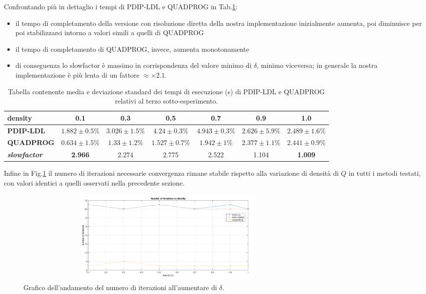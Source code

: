  Confrontando più in dettaglio i tempi di PDIP-LDL e QUADPROG in Tab.\ref{tab:ldlqp3}:
 \begin{itemize}
     \item il tempo di completamento della versione con risoluzione diretta della nostra implementazione inizialmente aumenta, poi diminuisce per poi stabilizzarsi intorno a valori simili a quelli di QUADPROG
     \item il tempo di completamento di QUADPROG, invece, aumenta monotonamente
     \item di conseguenza lo slowfactor è massimo in corrispondenza del valore minimo di $\delta$, minimo viceversa; in generale la nostra implementazione è più lenta di un fattore $\approx \times2.1$.
 \end{itemize}
\begin{table}[!h]
\centering
\begin{tabular}{l|c|c|c|c|c|c}
\textbf{density}                     & \textbf{0.1} & \textbf{0.3} & \textbf{0.5} & \textbf{0.7} & \textbf{0.9} & \textbf{1.0} \\ \hline
\textbf{PDIP-LDL}                    & $1.882 \pm 0.5\%$       & $3.026 \pm 1.5\%$       & $4.24  \pm 0.3\%$       & $4.943 \pm 0.3\%$       & $2.626 \pm 5.9\%$       & $2.489  \pm 1.6\%$       \\
\textbf{QUADPROG}                    & $0.634  \pm 1.5\%$      & $1.33  \pm 1.2\%$       & $1.527 \pm 0.7\%$       & $1.942 \pm 1\%$       & $2.377 \pm 1.1\%$       & $2.441 \pm 0.9\%$       \\
\textbf{\textit{slowfactor}} & \textbf{2.966}       & 2.274       & 2.775       & 2.522       & 1.104       & \textbf{1.009}
\end{tabular}
\caption{Tabella contenente media e deviazione standard dei tempi di esecuzione (s) di PDIP-LDL e QUADPROG relativi al terzo sotto-esperimento. \label{tab:ldlqp3}}
\end{table}

 Infine in Fig.\ref{fig:exp3.2} il numero di iterazioni necessarie convergenza rimane stabile rispetto alla variazione di densità di $Q$ in tutti i metodi testati, con valori identici a quelli osservati nella precedente sezione. 
 

\begin{figure}[!h]
    \centering
    \includegraphics[width=0.75\textwidth, height = 4.65cm]{img/MU9.png}
    \caption{Grafico dell'andamento del numero di iterazioni all'aumentare di $\delta$. \label{fig:exp3.2}}
\end{figure}

